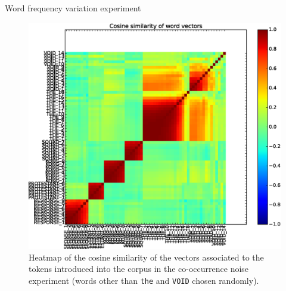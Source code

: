 \documentclass{article} %
\newcommand{\word}[1]{\texttt{#1}}
\begin{document}
\begin{section}{Word frequency variation experiment}
\begin{figure}\label{word-frequency-experiment-heatmap}
	\includegraphics[scale=0.5]{word-frequency-experiment-heatmap}
	\caption{
	Heatmap of the cosine similarity of the vectors associated to the
	tokens introduced into the corpus in the co-occurrence noise experiment
	(words other than \word{the} and \word{VOID} chosen randomly).
	}
\end{figure}

\begin{table}\label{word-frequency-experiment-cosine-similarity}
	
	\caption{
	The most similar words in the original vocabulary to the tokens
	introduced into the corpus associated to the word \word{the},
	and their cosine similarity with the most frequent such token,
	\word{THE\_1}.  It is apparent from the nearest neigbours that
	the word vectors of the low frequency tokens have not been
	adequately trained (there were inadequate samples).
	}
\end{table}


\end{section}
\end{document}
